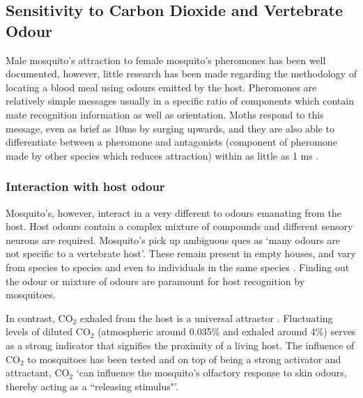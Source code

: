 \subsection{Sensitivity to Carbon Dioxide and Vertebrate Odour}
Male mosquito's attraction to female mosquito's pheromones has been well documented, however, little research has been made regarding the methodology of locating a blood meal using odours emitted by the host. Pheromones are relatively simple messages usually in a specific ratio of components which contain mate recognition information as well as orientation. Moths respond to this message, even as brief as 10ms by surging upwards\cite{mafra1994}, and they are also able to differentiate between a pheromone and antagonists (component of pheromone made by other species which reduces attraction) within as little as 1 ms \cite{baker1998moth}.
\subsubsection{Interaction with host odour}
Mosquito's, however, interact in a very different to odours emanating from the host. Host odours contain a complex mixture of compounds\cite{bowen1996sensory} and different sensory neurons are required. Mosquito's pick up ambiguous ques as \lq many odours are not specific to a vertebrate host\rq\cite{Dekker2963}. These remain present in empty houses, and vary from species to species and even to individuals in the same species \cite{bernier2001chemical}. Finding out the odour or mixture of odours are paramount for host recognition by mosquitoes.

In contrast, CO$_2$ exhaled from the host is a universal attractor \cite{reeves1953}. Fluctuating levels of diluted CO$_2$ (atmospheric around 0.035\% and exhaled around 4\%) serves as a strong indicator that signifies the proximity of a living host. The influence of CO$_2$ to mosquitoes has been tested and on top of being a strong activator and attractant, CO$_2$ \lq can influence the mosquito's olfactory response to skin odours, thereby acting as a ``releasing stimulus"\rq\cite{Dekker2963}. 

